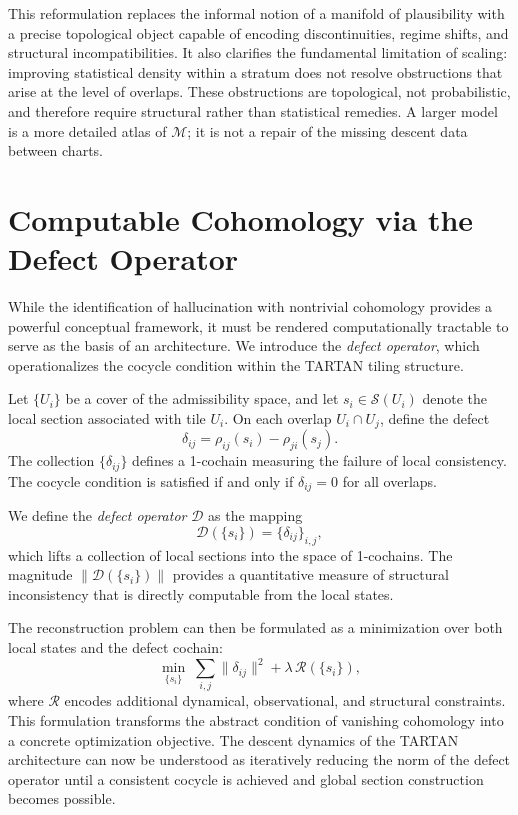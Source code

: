 \documentclass[11pt, oneside]{article}
\begin{document}
This reformulation replaces the informal notion of a manifold of plausibility with a precise topological object capable of encoding discontinuities, regime shifts, and structural incompatibilities. It also clarifies the fundamental limitation of scaling: improving statistical density within a stratum does not resolve obstructions that arise at the level of overlaps. These obstructions are topological, not probabilistic, and therefore require structural rather than statistical remedies. A larger model is a more detailed atlas of $\mathcal{M}$; it is not a repair of the missing descent data between charts.

\section{Computable Cohomology via the Defect Operator}

While the identification of hallucination with nontrivial cohomology provides a powerful conceptual framework, it must be rendered computationally tractable to serve as the basis of an architecture. We introduce the \emph{defect operator}, which operationalizes the cocycle condition within the TARTAN tiling structure.

Let $\{U_i\}$ be a cover of the admissibility space, and let $s_i \in \mathcal{S}(U_i)$ denote the local section associated with tile $U_i$. On each overlap $U_i \cap U_j$, define the defect
\[
\delta_{ij} = \rho_{ij}(s_i) - \rho_{ji}(s_j).
\]
The collection $\{\delta_{ij}\}$ defines a 1-cochain measuring the failure of local consistency. The cocycle condition is satisfied if and only if $\delta_{ij} = 0$ for all overlaps.

We define the \emph{defect operator} $\mathcal{D}$ as the mapping
\[
\mathcal{D}(\{s_i\}) = \{\delta_{ij}\}_{i,j},
\]
which lifts a collection of local sections into the space of 1-cochains. The magnitude $\|\mathcal{D}(\{s_i\})\|$ provides a quantitative measure of structural inconsistency that is directly computable from the local states.

The reconstruction problem can then be formulated as a minimization over both local states and the defect cochain:
\[
\min_{\{s_i\}} \; \sum_{i,j} \|\delta_{ij}\|^2 + \lambda \, \mathcal{R}(\{s_i\}),
\]
where $\mathcal{R}$ encodes additional dynamical, observational, and structural constraints. This formulation transforms the abstract condition of vanishing cohomology into a concrete optimization objective. The descent dynamics of the TARTAN architecture can now be understood as iteratively reducing the norm of the defect operator until a consistent cocycle is achieved and global section construction becomes possible.
\end{document}
